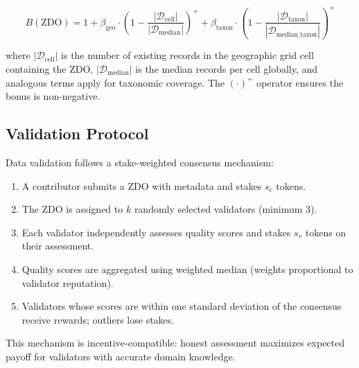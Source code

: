 \begin{equation}
    B(\text{ZDO}) = 1 + \beta_{\text{geo}} \cdot \left(1 - \frac{|\mathcal{D}_{\text{cell}}|}{|\mathcal{D}_{\text{median}}|}\right)^+ + \beta_{\text{taxon}} \cdot \left(1 - \frac{|\mathcal{D}_{\text{taxon}}|}{|\mathcal{D}_{\text{median\_taxon}}|}\right)^+
\end{equation}

\noindent where $|\mathcal{D}_{\text{cell}}|$ is the number of existing records in the geographic grid cell containing the ZDO, $|\mathcal{D}_{\text{median}}|$ is the median records per cell globally, and analogous terms apply for taxonomic coverage.
The $(\cdot)^+$ operator ensures the bonus is non-negative.

\subsection{Validation Protocol}

Data validation follows a stake-weighted consensus mechanism:

\begin{enumerate}[leftmargin=*]
    \item A contributor submits a ZDO with metadata and stakes $s_c$ tokens.
    \item The ZDO is assigned to $k$ randomly selected validators (minimum 3).
    \item Each validator independently assesses quality scores and stakes $s_v$ tokens on their assessment.
    \item Quality scores are aggregated using weighted median (weights proportional to validator reputation).
    \item Validators whose scores are within one standard deviation of the consensus receive rewards; outliers lose stakes.
\end{enumerate}

This mechanism is incentive-compatible: honest assessment maximizes expected payoff for validators with accurate domain knowledge.

